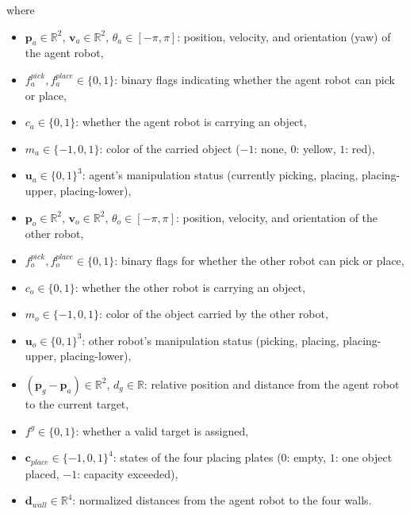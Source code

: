 \documentclass[english, 12pt, a4paper, elec, utf8, a-2b, online]{aaltothesis}
\begin{document}
where
\begin{itemize}
    \item $\mathbf{p}_a \in \mathbb{R}^2$, $\mathbf{v}_a \in \mathbb{R}^2$, $\theta_a \in [-\pi,\pi]$: position, velocity, and orientation (yaw) of the agent robot,
    \item $f^{pick}_a, f^{place}_a \in \{0,1\}$: binary flags indicating whether the agent robot can pick or place,
    \item $c_a \in \{0,1\}$: whether the agent robot is carrying an object,
    \item $m_a \in \{-1,0,1\}$: color of the carried object (\(-1\): none, \(0\): yellow, \(1\): red),
    \item $\mathbf{u}_a \in \{0,1\}^3$: agent’s manipulation status (currently picking, placing, placing-upper, placing-lower),
    \item $\mathbf{p}_o \in \mathbb{R}^2$, $\mathbf{v}_o \in \mathbb{R}^2$, $\theta_o \in [-\pi,\pi]$: position, velocity, and orientation of the other robot,
    \item $f^{pick}_o, f^{place}_o \in \{0,1\}$: binary flags for whether the other robot can pick or place,
    \item $c_o \in \{0,1\}$: whether the other robot is carrying an object,
    \item $m_o \in \{-1,0,1\}$: color of the object carried by the other robot,
    \item $\mathbf{u}_o \in \{0,1\}^3$: other robot’s manipulation status (picking, placing, placing-upper, placing-lower),
    \item $(\mathbf{p}_{g}-\mathbf{p}_a) \in \mathbb{R}^2$, $d_g \in \mathbb{R}$: relative position and distance from the agent robot to the current target,
    \item $f^{g} \in \{0,1\}$: whether a valid target is assigned,
    \item $\mathbf{c}_{place} \in \{-1,0,1\}^4$: states of the four placing plates ($0$: empty, $1$: one object placed, $-1$: capacity exceeded),
    \item $\mathbf{d}_{wall} \in \mathbb{R}^4$: normalized distances from the agent robot to the four walls.
\end{itemize}
\end{document}
